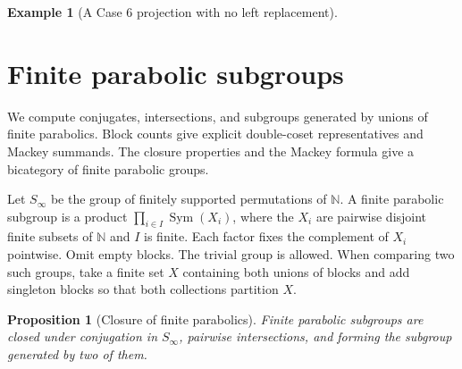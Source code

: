 \documentclass[11pt,a4paper]{article}
\numberwithin{equation}{section}
\newtheorem{proposition}[theorem]{Proposition}
\theoremstyle{definition}
\newtheorem{example}{Example}[section]
\begin{document}
\begin{example}[A Case 6 projection with no left replacement]
\begin{center}
\end{center}
\end{example}


\section{Finite parabolic subgroups}\label{sec:finite-parabolic}

We compute conjugates, intersections, and subgroups generated by
unions of finite parabolics. Block counts give explicit double-coset
representatives and Mackey summands. The closure properties and the
Mackey formula give a bicategory of finite parabolic groups.

Let \(S_\infty\) be the group of finitely supported permutations of
\(\mathbb N\). A finite parabolic subgroup is a product
\(\prod_{i\in I}\operatorname{Sym}(X_i)\), where the \(X_i\) are pairwise
disjoint finite subsets of \(\mathbb N\) and \(I\) is finite. Each factor fixes the
complement of \(X_i\) pointwise. Omit empty blocks. The trivial group
is allowed. When comparing two such groups, take a finite set \(X\) containing both
unions of blocks and add singleton blocks so that both collections
partition \(X\).

\begin{proposition}[Closure of finite parabolics]\label{prop:parabolic-closure}
Finite parabolic subgroups are closed under conjugation in
\(S_\infty\), pairwise intersections, and forming the subgroup
generated by two of them.
\end{proposition}
\end{document}
